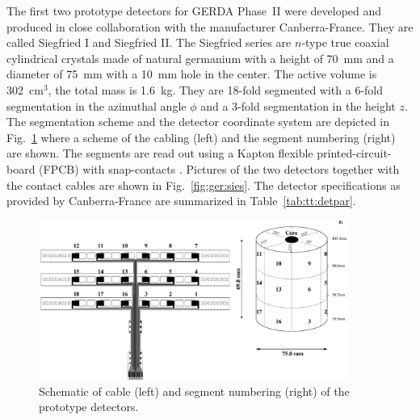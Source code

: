 The first two prototype detectors for GERDA Phase~II were developed and produced in close collaboration with the manufacturer Canberra-France. They are called Siegfried I and Siegfried II. The Siegfried series are $n$-type true coaxial cylindrical crystals made of natural germanium with a height of 70~mm and a diameter of 75~mm with a 10~mm hole in the center. The active volume is 302~cm$^{3}$, the total mass is 1.6~kg. They are 18-fold segmented with a 6-fold segmentation in the azimuthal angle $\phi$ and a 3-fold segmentation in the height $z$. The segmentation scheme and the detector coordinate system are depicted in Fig.~\ref{fig:ger:segm} where a scheme of the cabling (left) and the segment numbering (right) are shown. The segments are read out using a Kapton flexible printed-circuit-board (FPCB) with snap-contacts \cite{Sie07}. Pictures of the two detectors together with the contact cables are shown in Fig.~\ref{fig:ger:sies}. The detector specifications as provided by Canberra-France are summarized in Table~\ref{tab:tt:detpar}.

\begin{figure}[tbhp]
\centering
\includegraphics[width=0.9\textwidth]{segmentation_scheme}  
\caption{Schematic of cable (left) and segment numbering (right) of the prototype detectors.}
\label{fig:ger:segm}
\end{figure}

